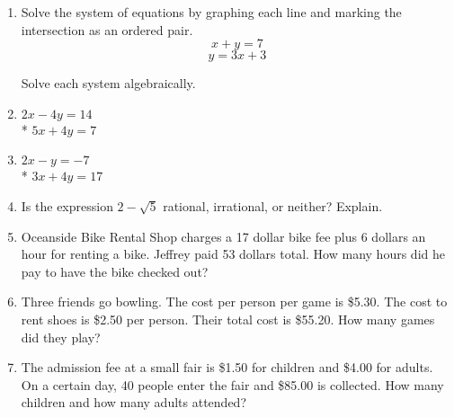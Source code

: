 \documentclass[12pt, oneside]{article}
\begin{document}
\begin{enumerate}
  \begin{center} %
  \end{center}

\newpage
  \item Solve the system of equations by graphing each line and marking the intersection as an ordered pair.
    \[x+y=7\]
    \[y=3x+3\]

\begin{center} %
\end{center}

\newpage
  Solve each system algebraically.
  \item
  $2x-4y=14$\\*
  $5x+4y=7$ \vspace{6cm}

  \item
  $2x-y=-7$\\*
  $3x+4y=17$  \vspace{6cm}


  \item Is the expression $2-\sqrt{5}$ rational, irrational, or neither? Explain.

\newpage
  \item Oceanside Bike Rental Shop charges a 17 dollar bike fee plus 6 dollars an hour for renting a bike. Jeffrey paid 53 dollars total. How many hours did he pay to have the bike checked out? \vspace{6cm}

  \item Three friends go bowling. The cost per person per game is \$5.30. The cost to rent shoes is \$2.50 per person. Their total cost is \$55.20. How many games did they play? \vspace{6cm}

  \item The admission fee at a small fair is \$1.50 for children and \$4.00 for adults. On a certain day, 40 people enter the fair and \$85.00 is collected. How many children and how many adults attended?


\end{enumerate}
\end{document}
